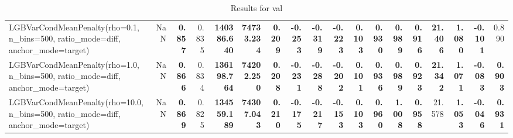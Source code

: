 \documentclass[11pt]{article}
\theoremstyle{plain}
\theoremstyle{definition}
\newcommand{\1}{\mathbf{1}}
\begin{document}
\begin{table}[htbp]
{\begin{tabular}{lrrrrrrrrrrrrrrrrr}
LGBVarCondMeanPenalty(rho=0.1, n\_bins=500, ratio\_mode=diff, anchor\_mode=target) & NaN & \textbf{0.857} & 0.835 & \textbf{140386.640} & \textbf{74733.234} & \textbf{0.209} & \textbf{-0.253} & \textbf{-0.319} & \textbf{-0.223} & \textbf{0.103} & \textbf{0.930} & \textbf{0.989} & \textbf{0.916} & \textbf{21.406} & \textbf{1.080} & \textbf{-0.101} & 0.890 \\
LGBVarCondMeanPenalty(rho=1.0, n\_bins=500, ratio\_mode=diff, anchor\_mode=target) & NaN & \textbf{0.866} & 0.834 & \textbf{136198.764} & \textbf{74202.250} & \textbf{0.208} & \textbf{-0.231} & \textbf{-0.288} & \textbf{-0.202} & \textbf{0.101} & \textbf{0.936} & \textbf{0.989} & \textbf{0.923} & \textbf{21.342} & \textbf{1.071} & \textbf{-0.083} & \textbf{0.903} \\
LGBVarCondMeanPenalty(rho=10.0, n\_bins=500, ratio\_mode=diff, anchor\_mode=target) & NaN & \textbf{0.869} & 0.825 & \textbf{134559.189} & \textbf{74307.043} & \textbf{0.210} & \textbf{-0.175} & \textbf{-0.217} & \textbf{-0.153} & \textbf{0.103} & \textbf{0.960} & \textbf{1.008} & \textbf{0.958} & 21.578 & \textbf{1.053} & \textbf{-0.046} & \textbf{0.931} \\
\bottomrule
\end{tabular}
     }
    \caption{Results for val}
    \label{tab:results_val}
\end{table}
\end{document}
